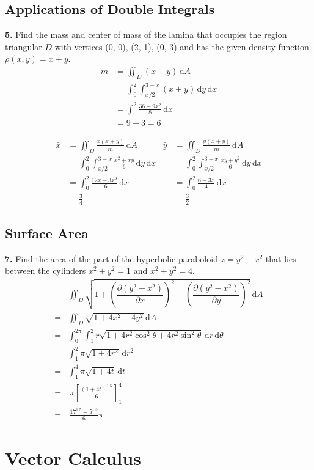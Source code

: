 \documentclass[a4paper,12pt]{article}
\newcommand{\ud}{\,\mathrm{d}}
\newcommand{\tho}[3][]{\dfrac{\partial #1 #2}{\partial #3 #1}}
\newcommand{\exercise}[1]{\noindent\textbf{#1.}}
\begin{document}
\subsection{Applications of Double Integrals}
\exercise{5} Find the mass and center of mass of the lamina that occupies
the region triangular $D$ with vertices (0, 0), (2, 1), (0, 3)
and has the given density function $\rho(x, y) = x + y$.
\begin{align*}
m &= \iint_D(x + y)\ud A\\
  &= \int_0^2\int_{x/2}^{3-x}(x+y)\ud y\ud x\\
  &= \int_0^2\frac{36 - 9x^2}{8}\ud x\\
  &= 9 - 3 = 6
\end{align*}

\begin{align*}
  \bar x &= \iint_D\frac{x(x + y)}{m}\ud A&
  \bar y &= \iint_D\frac{y(x + y)}{m}\ud A\\
  &= \int_0^2\int_{x/2}^{3-x}\frac{x^2 + xy}{6}\ud y\ud x&
  &= \int_0^2\int_{x/2}^{3-x}\frac{xy + y^2}{6}\ud y\ud x\\
  &= \int_0^2\frac{12x - 3x^3}{16}\ud x&
  &= \int_0^2\frac{6 - 3x}{4}\ud x\\
  &= \frac{3}{4}&
  &= \frac{3}{2}
\end{align*}

\subsection{Surface Area}
\exercise{7} Find the area of the part of
the hyperbolic paraboloid $z = y^2 - x^2$
that lies between the cylinders $x^2 + y^2 = 1$ and $x^2 + y^2 = 4$.
\begin{align*}
  &\iint_D\sqrt{1 + \left(\tho{(y^2 - x^2)}{x}\right)^2
                  + \left(\tho{(y^2 - x^2)}{y}\right)^2}\ud A\\
= &\iint_D\sqrt{1 + 4x^2 + 4y^2}\ud A\\
= &\int_0^{2\pi}\int_1^2 r\sqrt{1 + 4r^2\cos^2\theta + 4r^2\sin^2\theta}
   \ud r\ud\theta\\
= &\int_1^2\pi\sqrt{1 + 4r^2}\ud r^2\\
= &\int_1^4\pi\sqrt{1 + 4t}\ud t\\
= &\,\pi\left[\frac{(1 + 4t)^{1.5}}{6}\right]_1^4\\
= &\,\frac{17^{1.5} - 5^{1.5}}{6}\pi
\end{align*}

\section{Vector Calculus}
\setcounter{subsection}{1}
\end{document}
